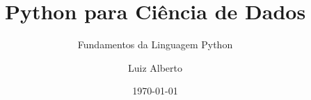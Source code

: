 \documentclass[t, final, 12pt, xcolor={usenames,dvipsnames}, table]{beamer}
\author{Luiz Alberto}
\title{Python para Ciência de Dados}
\subtitle{Fundamentos da Linguagem Python}
\institute{Ciência da Computação}
\date{\today}
\begin{document}
  \begin{frame}[t,plain]
    \titlepage
  \end{frame}
  
  
  
  
  
  
  
  
  
  
  
  
  
  
  
  
  
  
  
  
    
  
  
  
  
\end{document}
